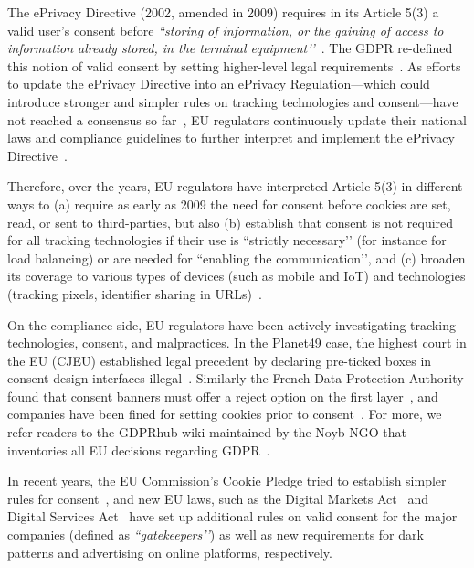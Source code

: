 %
The ePrivacy Directive (2002, amended in 2009) requires in its Article 5(3) a valid user’s consent before \textit{``storing of information, or the gaining of access to information already stored, in the terminal equipment’’}~\cite{Directive2002582002,Directive20091362009}. The GDPR re-defined this notion of valid consent by setting higher-level legal requirements~\cite{santosAreCookieBanners2020}. As efforts to update the ePrivacy Directive into an ePrivacy Regulation---which could introduce stronger and simpler rules on tracking technologies and consent---have not reached a consensus so far~\cite{europeancommissionProposalEPrivacyRegulation2024}, EU regulators continuously update their national laws and compliance guidelines to further interpret and implement the ePrivacy Directive~\cite{Bielova2024-zr}.

Therefore, over the years, EU regulators have interpreted Article 5(3) in different ways to (a) require as early as 2009 the need for consent before cookies are set, read, or sent to third-parties, but also (b) establish that consent is not required for all tracking technologies if their use is ``strictly necessary’’ (for instance for load balancing) or are needed for ``enabling the communication’’, and (c) broaden its coverage to various types of devices (such as mobile and IoT) and technologies (tracking pixels, identifier sharing in URLs)~\cite{Guidelines22023}. 

On the compliance side, EU regulators have been actively investigating tracking technologies, consent, and malpractices. In the Planet49 case, the highest court in the EU (CJEU) established legal precedent by declaring pre-ticked boxes in consent design interfaces illegal~\cite{CJEUC67317}. Similarly the French Data Protection Authority found that consent banners must offer a reject option on the first layer~\cite{ClosureInjunctionIssued2023,CNILFranceSAN2021024}, and companies have been fined for setting cookies prior to consent~\cite{CNILFranceSAN2020012,DeliberationSAN20200127}. For more, we refer readers to the GDPRhub wiki maintained by the Noyb NGO that inventories all EU decisions regarding GDPR~\cite{GDPRhub}.

In recent years, the EU Commission’s Cookie Pledge tried to establish simpler rules for consent~\cite{europeancommissionCookiePledgeEuropean2023}, and new EU laws, such as the Digital Markets Act~\cite{RegulationEU20222022} and Digital Services Act~\cite{RegulationEU20222022a} have set up additional rules on valid consent for the major companies (defined as \textit{``gatekeepers’’}) as well as new requirements for dark patterns and advertising on online platforms, respectively.

